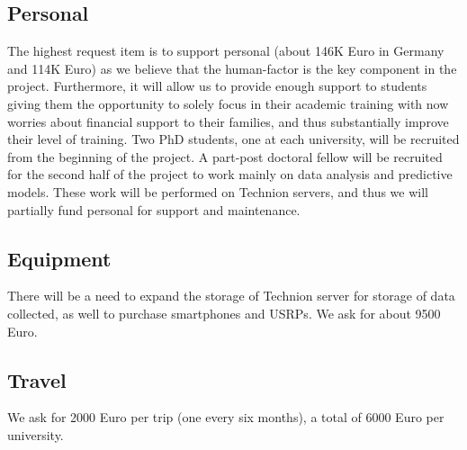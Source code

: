 \documentclass[12pt]{article}
\begin{document}
\subsection*{Personal}
The highest request item is to support personal (about 146K Euro in Germany and 114K Euro) as we believe that the human-factor is the key component in the project. Furthermore, it will allow us to provide enough support to students giving them the opportunity to solely focus in their academic training with now worries about financial support to their families, and thus substantially improve their level of training. Two PhD students, one at each university, will be recruited from the beginning of the project. A part-post doctoral fellow will be recruited for the second half of the project to work mainly on data analysis and predictive models. These work will be performed on Technion servers, and thus we will partially fund personal for support and maintenance.  

\subsection*{Equipment}
There will be a need to expand the storage of Technion server for storage of data collected, as well to purchase smartphones and USRPs. We ask for about 9500 Euro.

\subsection*{Travel}
We ask for 2000 Euro per trip (one every six months), a total of 6000 Euro per university.
\end{document}
